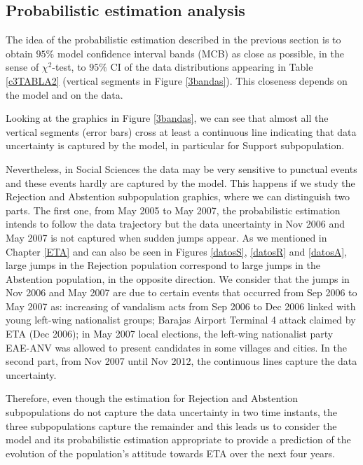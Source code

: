 \subsection{Probabilistic estimation analysis}
The idea of the probabilistic estimation described in the previous section is to obtain $95\%$ model confidence interval bands (MCB) as close as possible, in the sense of $\chi^2$-test, to $95\%$ CI of the data distributions appearing in Table \ref{c3TABLA2} (vertical segments in Figure \ref{3bandas}). This closeness depends on the model and on the data. 

Looking at the graphics in Figure \ref{3bandas}, we can see that almost all the vertical segments (error bars) cross at least a continuous line indicating that data uncertainty is captured by the model, in particular for Support subpopulation. 

Nevertheless, in Social Sciences the data may be very sensitive to punctual events and these events hardly are captured by the model. This happens if we study the Rejection and Abstention subpopulation graphics, where we can distinguish two parts. The first one, from May 2005 to May 2007, the probabilistic estimation intends to follow the data trajectory but the data uncertainty in Nov 2006 and May 2007 is not captured when sudden jumps appear. As we mentioned in Chapter \ref{ETA} and can also be seen in Figures \ref{datosS}, \ref{datosR} and \ref{datosA}, large jumps in the Rejection population correspond to large jumps in the Abstention population, in the opposite direction. We consider that the jumps in Nov 2006 and May 2007 are due to certain events that occurred from Sep 2006 to May 2007 as: increasing of vandalism acts from Sep 2006 to Dec 2006 linked with young left-wing nationalist groups; Barajas Airport Terminal 4 attack claimed by ETA (Dec 2006); in May 2007 local elections, the left-wing nationalist party EAE-ANV was allowed to present candidates in some villages and cities. In the second part, from Nov 2007 until Nov 2012, the continuous lines capture the data uncertainty.


Therefore, even though the estimation for Rejection and Abstention subpopulations do not capture the data uncertainty in two time instants, the three subpopulations capture the remainder and this leads us to consider the model and its probabilistic estimation appropriate to provide a prediction of the evolution of the population's attitude towards ETA over the next four years. 

